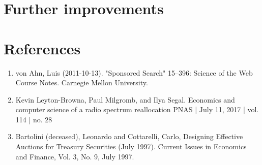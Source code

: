 \documentclass[a4paper]{article}
\begin{document}
\section*{Further improvements}
\newpage
\section*{References}
\begin{enumerate}
 \item von Ahn, Luis (2011-10-13). "Sponsored Search" 15–396: Science of the Web Course Notes. Carnegie Mellon University.
 \item Kevin Leyton-Browna, Paul Milgromb, and Ilya Segal. Economics and computer science of a radio
spectrum reallocation PNAS | July 11, 2017 | vol. 114 | no. 28
\item Bartolini (deceased), Leonardo and Cottarelli, Carlo, Designing Effective Auctions for Treasury Securities (July 1997). Current Issues in Economics and Finance, Vol. 3, No. 9, July 1997. 
 \end{enumerate}
\end{document}
